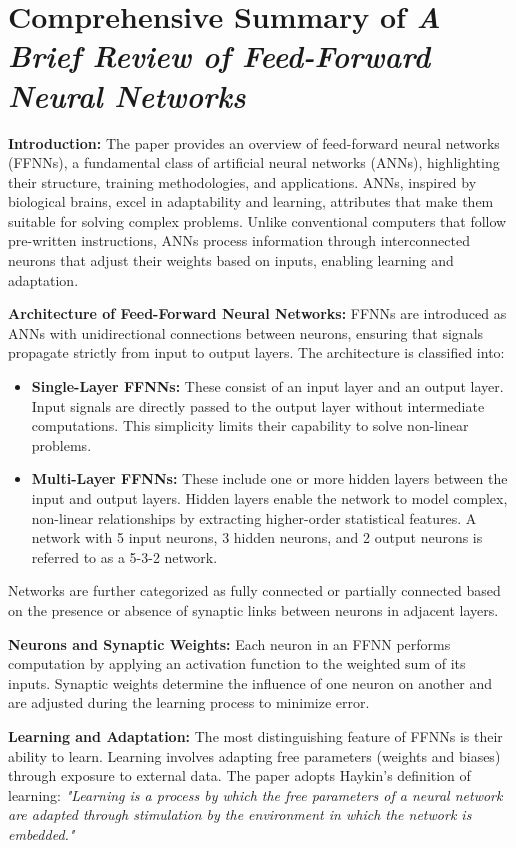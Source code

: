 
\section*{Comprehensive Summary of \textit{A Brief Review of Feed-Forward Neural Networks}}

\textbf{Introduction:} The paper provides an overview of feed-forward neural networks (FFNNs), a fundamental class of artificial neural networks (ANNs), highlighting their structure, training methodologies, and applications. ANNs, inspired by biological brains, excel in adaptability and learning, attributes that make them suitable for solving complex problems. Unlike conventional computers that follow pre-written instructions, ANNs process information through interconnected neurons that adjust their weights based on inputs, enabling learning and adaptation.

\textbf{Architecture of Feed-Forward Neural Networks:} FFNNs are introduced as ANNs with unidirectional connections between neurons, ensuring that signals propagate strictly from input to output layers. The architecture is classified into:
\begin{itemize}
    \item \textbf{Single-Layer FFNNs:} These consist of an input layer and an output layer. Input signals are directly passed to the output layer without intermediate computations. This simplicity limits their capability to solve non-linear problems.
    \item \textbf{Multi-Layer FFNNs:} These include one or more hidden layers between the input and output layers. Hidden layers enable the network to model complex, non-linear relationships by extracting higher-order statistical features. A network with 5 input neurons, 3 hidden neurons, and 2 output neurons is referred to as a 5-3-2 network. 
\end{itemize}
Networks are further categorized as fully connected or partially connected based on the presence or absence of synaptic links between neurons in adjacent layers.

\textbf{Neurons and Synaptic Weights:} Each neuron in an FFNN performs computation by applying an activation function to the weighted sum of its inputs. Synaptic weights determine the influence of one neuron on another and are adjusted during the learning process to minimize error.

\textbf{Learning and Adaptation:} The most distinguishing feature of FFNNs is their ability to learn. Learning involves adapting free parameters (weights and biases) through exposure to external data. The paper adopts Haykin's definition of learning: \textit{"Learning is a process by which the free parameters of a neural network are adapted through stimulation by the environment in which the network is embedded."}

